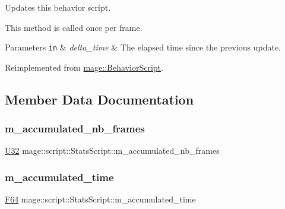 Updates this behavior script.

This method is called once per frame.


\begin{DoxyParams}[1]{Parameters}
\mbox{\tt in}  & {\em delta\+\_\+time} & The elapsed time since the previous update. \\
\hline
\end{DoxyParams}


Reimplemented from \hyperlink{classmage_1_1_behavior_script_afb9cf3759edf8876416d1df85489cba6}{mage\+::\+Behavior\+Script}.



\subsection{Member Data Documentation}
\hypertarget{classmage_1_1script_1_1_stats_script_a7ef910aceb585af53110697ea5b3f810}{}\label{classmage_1_1script_1_1_stats_script_a7ef910aceb585af53110697ea5b3f810} 
\subsubsection{\texorpdfstring{m\+\_\+accumulated\+\_\+nb\+\_\+frames}{m\_accumulated\_nb\_frames}}
{\footnotesize\ttfamily \hyperlink{namespacemage_a41c104c036fba3756a74e19f793eeaa1}{U32} mage\+::script\+::\+Stats\+Script\+::m\+\_\+accumulated\+\_\+nb\+\_\+frames\hspace{0.3cm}{\ttfamily [private]}}

\hypertarget{classmage_1_1script_1_1_stats_script_a41c1a4a0c73a6d5778b8ac7cd9d41bbc}{}\label{classmage_1_1script_1_1_stats_script_a41c1a4a0c73a6d5778b8ac7cd9d41bbc} 
\subsubsection{\texorpdfstring{m\+\_\+accumulated\+\_\+time}{m\_accumulated\_time}}
{\footnotesize\ttfamily \hyperlink{namespacemage_ad26233bbec640deda836e572c1a23708}{F64} mage\+::script\+::\+Stats\+Script\+::m\+\_\+accumulated\+\_\+time\hspace{0.3cm}{\ttfamily [private]}}

